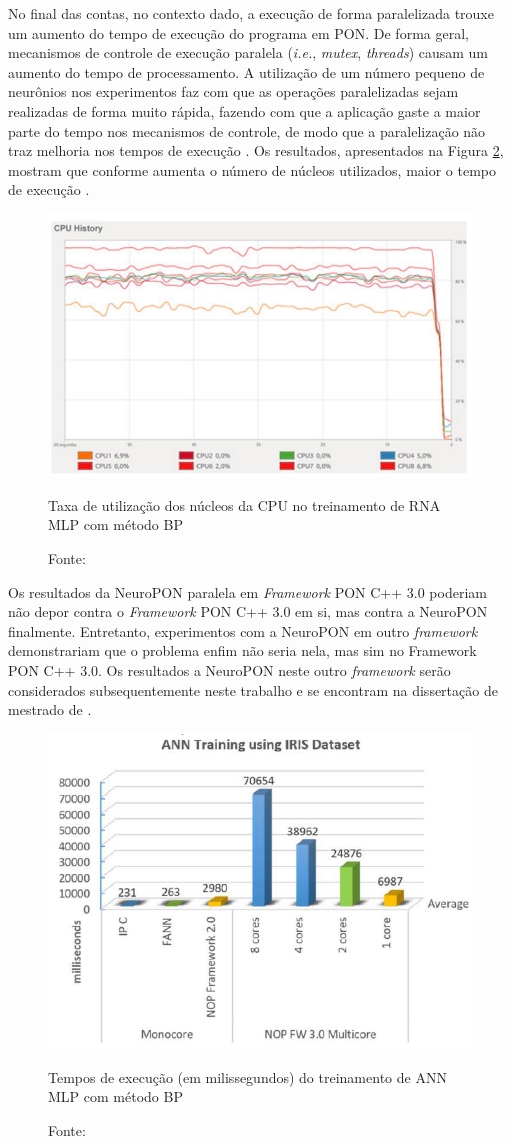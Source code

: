 No final das contas, no contexto dado, a execução de forma paralelizada trouxe
um aumento do tempo de execução do programa em PON. De forma geral, mecanismos
de controle de execução paralela (\textit{i.e.}, \textit{mutex},
\textit{threads}) causam um aumento do tempo de processamento. A utilização de
um número pequeno de neurônios nos experimentos faz com que as operações
paralelizadas sejam realizadas de forma muito rápida, fazendo com que a
aplicação gaste a maior parte do tempo nos mecanismos de controle, de modo que a
paralelização não traz melhoria nos tempos de execução \cite{schutz_2018}. Os
resultados, apresentados na Figura \ref{fig:pon_multi}, mostram que conforme
aumenta o número de núcleos utilizados, maior o tempo de execução
\cite{schutz_2018}.

\begin{figure}[!htb]
  \centering
  \includegraphics[width=.65\textwidth]{../figures/core_usage_cpp3.png}
  \caption{Taxa de utilização dos núcleos da CPU no treinamento de RNA MLP com método BP}
  \caption*{Fonte: }
  \label{fig:core_usage_cpp3}
\end{figure}

Os resultados da NeuroPON paralela em \textit{Framework} PON C++ 3.0 poderiam
não depor contra o \textit{Framework} PON C++ 3.0 em si, mas contra a NeuroPON
finalmente. Entretanto, experimentos com a NeuroPON em outro \textit{framework}
demonstrariam que o problema enfim não seria nela, mas sim no Framework PON C++
3.0. Os resultados a NeuroPON neste outro \textit{framework} serão considerados
subsequentemente neste trabalho e se encontram na dissertação de mestrado de
.

\begin{figure}[!htb]
  \centering
  \includegraphics[width=.55\textwidth]{../figures/pon_multi_fix.png}
  \caption{Tempos de execução (em milissegundos) do treinamento de ANN MLP com método BP}
  \caption*{Fonte: }
  \label{fig:pon_multi}
\end{figure}

